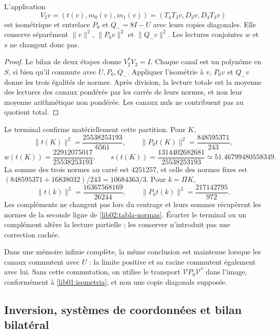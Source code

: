 \begin{proposition}
\label{lib02:memoria-ternaria}
L'application
\[
 V_2v=(t(v),m_0(v),m_1(v))
 =(T_4T_3v,D_3v,D_4T_3v)
\]
est isométrique et entrelace \(P_0\) et \(Q_-=8I-U\) avec leurs
copies diagonales. Elle conserve séparément \(\|v\|^2\),
\(\|P_0v\|^2\) et \(\|Q_-v\|^2\). Les lectures
conjointes \(w\) et \(s\) ne changent donc pas.
\end{proposition}
\begin{proof}
Le bilan de deux étapes donne \(V_2^*V_2=I\). Chaque canal est un polynôme en \(S\), si bien qu'il commute avec \(U,P_0,Q_-\). Appliquer l'isométrie à \(v\), \(P_0v\) et \(Q_-v\) donne les trois égalités de normes. Après division, la lecture totale est la moyenne des lectures des canaux pondérée par les carrés de leurs normes, et non leur moyenne arithmétique non pondérée. Les canaux nuls ne contribuent pas au quotient total.
\end{proof}

Le terminal confirme matériellement cette partition. Pour \(K\),
\[
 \|t(K)\|^2=\frac{25538253193}{6561},\qquad
 \|P_0t(K)\|^2=\frac{848595371}{243},
\]
\[
 w(t(K))=\frac{22912075017}{25538253193},\qquad
 s(t(K))=\frac{1314402682681}{25538253193}
 \simeq51.46799480558349.
\]
La somme des trois normes au carré est \(4251257\), et celle des
normes fixes est
\((848595371+16838032)/243=10684363/3\). Pour \(k=\Pi K\),
\[
 \|t(k)\|^2=\frac{16367568169}{26244},\qquad
 \|P_0t(k)\|^2=\frac{217142795}{972}.
\]
Les compléments ne changent pas lors du centrage et leurs sommes récupèrent les normes
de la seconde ligne de \eqref{lib02:tabla-normas}. Écarter le terminal
ou un complément altère la lecture partielle ; les conserver n’introduit pas
une correction cachée.

Dans une mémoire infinie complète, la même conclusion est maintenue lorsque
les canaux commutent avec \(U\) : la limite positive et sa racine
commutent également avec lui. Sans cette commutation, on utilise le transport
\(\mathcal VP_0\mathcal V^*\) dans l’image, conformément à
\cref{lib01:isometria}, et non une copie diagonale supposée.

\subsection{Inversion, systèmes de coordonnées et bilan bilatéral}
\label{lib02:bidireccional}

